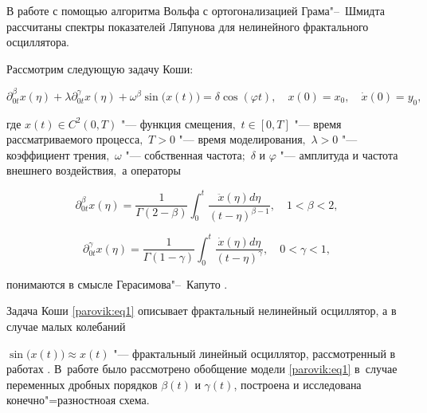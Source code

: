В работе с помощью алгоритма Вольфа с ортогонализацией Грама"--~Шмидта  рассчитаны спектры показателей Ляпунова для нелинейного фрактального осциллятора.






\begin{task}

Рассмотрим следующую задачу Коши{\/\rm:}

\begin{equation}

\label{parovik:eq1}

\partial _{0t}^\beta x( \eta  ) + \lambda \partial_{0t}^\gamma x( \eta  ) + {\omega ^\beta }\sin 

\bigl( x ( t ) \bigr) = \delta \cos ( \varphi t),\quad  x( 0 ) ={x_0}, \quad \dot x( 0 ) = {y_0},                

\end{equation}

где $x( t ) \in {C^2} ( 0, T )$ "--- функция смещения$,$ $t \in [ 0, T]$ "--- время  рассматриваемого процесса$,$ $T > 0$ "--- время моделирования$,$ $\lambda  > 0$ "--- коэффициент трения$,$ $\omega $ "--- собственная частота$;$ $\delta $ и $\varphi $ "--- амплитуда и частота внешнего воз\-дейс\-твия$,$  а операторы

\[

\partial _{0t}^\beta x( \eta  ) = \frac{1}{{\Gamma \left({2 - \beta } \right)}}\int _0^t {\frac{{\ddot x( \eta  )d\eta}}{{{{\left( {t - \eta } \right)}^{\beta  - 1}}}}}, \quad  1 < \beta  < 2,

\]

\[

 \partial _{0t}^\gamma x( \eta  ) = \frac{1}{{\Gamma \left( {1 - \gamma }\right)}}\int _0^t {\frac{{\dot x( \eta  )d\eta }}{{{{\left( {t- \eta } \right)}^\gamma }}}}, \quad  0 < \gamma  < 1,

\]

понимаются в смысле Герасимова"--~Капуто \rm \cite{parovik:12,  parovik:13}.

\end{task}



\smallskip



Задача Коши \eqref{parovik:eq1} описывает фрактальный нелинейный осциллятор, а в случае малых колебаний 

$\sin \bigl( x( t ) \bigr) \approx x( t )$ "--- фрактальный линейный осциллятор, рассмотренный в работах \cite{parovik:14, parovik:15}. В~работе \cite{parovik:16} было рассмотрено обобщение модели \eqref{parovik:eq1} в~случае переменных дробных порядков $\beta( t )$ и $\gamma( t )$, построена и исследована конечно"=разностноая схема. 

